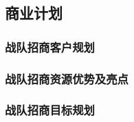 \subsection{商业计划}

    \subsubsection{战队招商客户规划}
    
    \subsubsection{战队招商资源优势及亮点}
    
    \subsubsection{战队招商目标规划}
